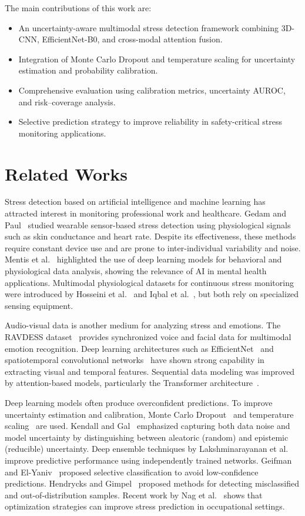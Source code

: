 \documentclass[conference]{IEEEtran}
\begin{document}
The main contributions of this work are:

\begin{itemize}
\item An uncertainty-aware multimodal stress detection framework combining 3D-CNN, EfficientNet-B0, and cross-modal attention fusion.
\item Integration of Monte Carlo Dropout and temperature scaling for uncertainty estimation and probability calibration.
\item Comprehensive evaluation using calibration metrics, uncertainty AUROC, and risk–coverage analysis.
\item Selective prediction strategy to improve reliability in safety-critical stress monitoring applications.
\end{itemize}

\section{Related Works}

Stress detection based on artificial intelligence and machine learning has attracted interest in monitoring professional work and healthcare. Gedam and Paul~\cite{ref1} studied wearable sensor-based stress detection using physiological signals such as skin conductance and heart rate. Despite its effectiveness, these methods require constant device use and are prone to inter-individual variability and noise. Mentis et al.~\cite{ref2} highlighted the use of deep learning models for behavioral and physiological data analysis, showing the relevance of AI in mental health applications. Multimodal physiological datasets for continuous stress monitoring were introduced by Hosseini et al.~\cite{ref3} and Iqbal et al.~\cite{ref4}, but both rely on specialized sensing equipment. 

Audio-visual data is another medium for analyzing stress and emotions. The RAVDESS dataset~\cite{ref5} provides synchronized voice and facial data for multimodal emotion recognition. Deep learning architectures such as EfficientNet~\cite{ref6} and spatiotemporal convolutional networks~\cite{ref7} have shown strong capability in extracting visual and temporal features. Sequential data modeling was improved by attention-based models, particularly the Transformer architecture~\cite{ref8}.

Deep learning models often produce overconfident predictions. To improve uncertainty estimation and calibration, Monte Carlo Dropout~\cite{ref9} and temperature scaling~\cite{ref10} are used. Kendall and Gal~\cite{ref11} emphasized capturing both data noise and model uncertainty by distinguishing between aleatoric (random) and epistemic (reducible) uncertainty. Deep ensemble techniques by Lakshminarayanan et al.~\cite{ref12} improve predictive performance using independently trained networks. Geifman and El-Yaniv~\cite{ref13} proposed selective classification to avoid low-confidence predictions. Hendrycks and Gimpel~\cite{ref14} proposed methods for detecting misclassified and out-of-distribution samples. Recent work by Nag et al.~\cite{ref15} shows that optimization strategies can improve stress prediction in occupational settings.
\end{document}
